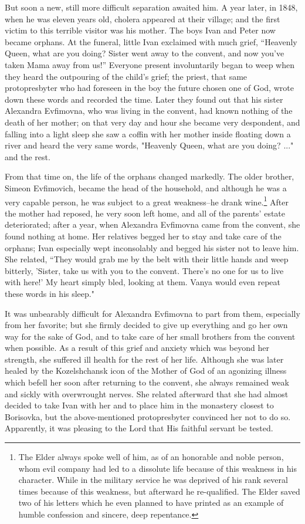But soon a new, still more difficult separation awaited him. A year later, in 1848, when he was eleven years old, cholera appeared at their village; and the first victim to this terrible visitor was his mother. The boys Ivan and Peter now became orphans. At the funeral, little Ivan exclaimed with much grief, “Heavenly Queen, what are you doing? Sister went away to the convent, and now you've taken Mama away from us!” Everyone present involuntarily began to weep when they heard the outpouring of the child's grief; the priest, that same protopresbyter who had foreseen in the boy the future chosen one of God, wrote down these words and recorded the time. Later they found out that his sister Alexandra Evfimovna, who was living in the convent, had known nothing of the death of her mother; on that very day and hour she became very despondent, and falling into a light sleep she saw a coffin with her mother inside floating down a river and heard the very same words, "Heavenly Queen, what are you doing? ..." and the rest.

From that time on, the life of the orphans changed markedly. The older brother, Simeon Evfimovich, became the head of the household, and although he was a very capable person, he was subject to a great weakness--he drank wine.\footnote{The Elder always spoke well of him, as of an honorable and noble person, whom evil company had led to a dissolute life because of this weakness in his character. While in the military service he was deprived of his rank several times because of this weakness, but afterward he re-qualified. The Elder saved two of his letters which he even planned to have printed as an example of humble confession and sincere, deep repentance.} After the mother had reposed, he very soon left home, and all of the parents' estate deteriorated; after a year, when Alexandra Evfimovna came from the convent, she found nothing at home. Her relatives begged her to stay and take care of the orphans; Ivan especially wept inconsolably and begged his sister not to leave him. She related, “They would grab me by the belt with their little hands and weep bitterly, 'Sister, take us with you to the convent. There's no one for us to live with here!' My heart simply bled, looking at them. Vanya would even repeat these words in his sleep."

It was unbearably difficult for Alexandra Evfimovna to part from them, especially from her favorite; but she firmly decided to give up everything and go her own way for the sake of God, and to take care of her small brothers from the convent when possible. As a result of this grief and anxiety which was beyond her strength, she suffered ill health for the rest of her life. Although she was later healed by the Kozelshchansk icon of the Mother of God of an agonizing illness which befell her soon after returning to the convent, she always remained weak and sickly with overwrought nerves. She related afterward that she had almost decided to take Ivan with her and to place him in the monastery closest to Borisovka, but the above-mentioned protopresbyter convinced her not to do so. Apparently, it was pleasing to the Lord that His faithful servant be tested.

